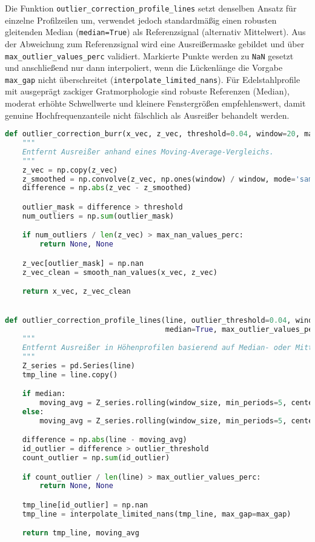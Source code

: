 Die Funktion \texttt{outlier\_correction\_profile\_lines} setzt denselben Ansatz für einzelne Profilzeilen um, verwendet jedoch standardmäßig einen robusten gleitenden Median (\texttt{median=True}) als Referenzsignal (alternativ Mittelwert). Aus der Abweichung zum Referenzsignal wird eine Ausreißermaske gebildet und über \texttt{max\_outlier\_values\_perc} validiert. Markierte Punkte werden zu \texttt{NaN} gesetzt und anschließend nur dann interpoliert, wenn die Lückenlänge die Vorgabe \texttt{max\_gap} nicht überschreitet (\texttt{interpolate\_limited\_nans}). Für Edelstahlprofile mit ausgeprägt zackiger Gratmorphologie sind robuste Referenzen (Median), moderat erhöhte Schwellwerte und kleinere Fenstergrößen empfehlenswert, damit genuine Hochfrequenzanteile nicht fälschlich als Ausreißer behandelt werden.

\begin{lstlisting}[language=Python, caption={Outlier Detection/Correction in der Profilvorverarbeitung}, label={lst:outlier-correction}]
def outlier_correction_burr(x_vec, z_vec, threshold=0.04, window=20, max_nan_values_perc=0.4):
    """
    Entfernt Ausreißer anhand eines Moving-Average-Vergleichs.
    """
    z_vec = np.copy(z_vec)
    z_smoothed = np.convolve(z_vec, np.ones(window) / window, mode='same')
    difference = np.abs(z_vec - z_smoothed)

    outlier_mask = difference > threshold
    num_outliers = np.sum(outlier_mask)

    if num_outliers / len(z_vec) > max_nan_values_perc:
        return None, None

    z_vec[outlier_mask] = np.nan
    z_vec_clean = smooth_nan_values(x_vec, z_vec)

    return x_vec, z_vec_clean


def outlier_correction_profile_lines(line, outlier_threshold=0.04, window_size=30,
                                     median=True, max_outlier_values_perc=0.35, max_gap=5):
    """
    Entfernt Ausreißer in Höhenprofilen basierend auf Median- oder Mittelwert-Vergleich.
    """
    Z_series = pd.Series(line)
    tmp_line = line.copy()

    if median:
        moving_avg = Z_series.rolling(window_size, min_periods=5, center=True).median()
    else:
        moving_avg = Z_series.rolling(window_size, min_periods=5, center=True).mean()

    difference = np.abs(line - moving_avg)
    id_outlier = difference > outlier_threshold
    count_outlier = np.sum(id_outlier)

    if count_outlier / len(line) > max_outlier_values_perc:
        return None, None

    tmp_line[id_outlier] = np.nan
    tmp_line = interpolate_limited_nans(tmp_line, max_gap=max_gap)

    return tmp_line, moving_avg
\end{lstlisting}

